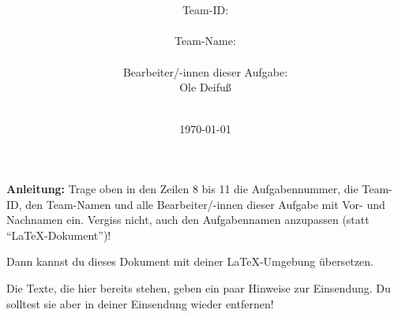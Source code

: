 \documentclass[a4paper,10pt,ngerman]{scrartcl}
\title{\textbf{\Huge\Aufgabe01}}
\author{\LARGE Team-ID: \LARGE \TeamId \\\\
\LARGE Team-Name: \LARGE \TeamName \\\\
\LARGE Bearbeiter/-innen dieser Aufgabe: \\
\LARGE Ole Deifuß\Namen\\\\}
\date{\LARGE\today}
\begin{document}
    \maketitle
    \tableofcontents

    \vspace{0.5cm}

    \textbf{Anleitung:} Trage oben in den Zeilen 8 bis 11 die Aufgabennummer, die Team-ID, den Team-Namen und alle Bearbeiter/-innen dieser Aufgabe mit Vor- und Nachnamen ein.
    Vergiss nicht, auch den Aufgabennamen anzupassen (statt "`\LaTeX-Dokument"')!

    Dann kannst du dieses Dokument mit deiner \LaTeX-Umgebung übersetzen.

    Die Texte, die hier bereits stehen, geben ein paar Hinweise zur Einsendung.
    Du solltest sie aber in deiner Einsendung wieder entfernen!
\end{document}
